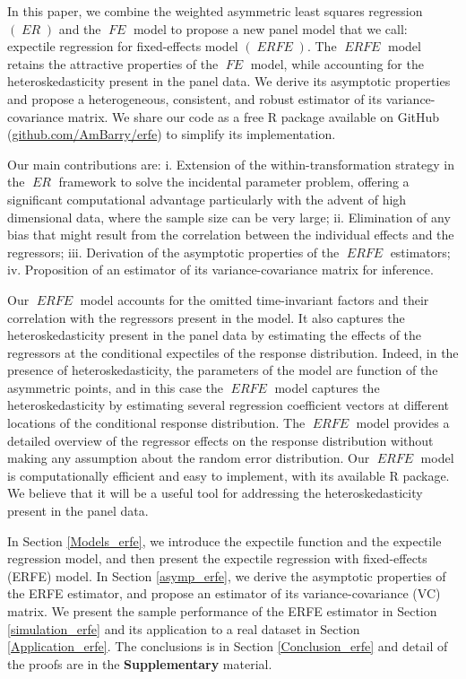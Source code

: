 \documentclass[15pt,a4paper]{article}
\DeclareMathOperator{\ERFE}{\textit{ERFE}}
\DeclareMathOperator{\ER}{\textit{ER}}
\DeclareMathOperator{\FE}{\textit{FE}}
\begin{document}
In this paper, we combine the weighted asymmetric least squares regression $(\ER)$ and the $\FE$ model to propose a new panel model that we call: expectile regression for fixed-effects model $(\ERFE).$ The $\ERFE$ model retains the attractive properties of the $\FE$ model, while accounting for the heteroskedasticity present in the panel data. We derive its asymptotic properties and propose a heterogeneous, consistent, and robust estimator of its variance-covariance matrix. We share our code as a free R package available on GitHub (\url{github.com/AmBarry/erfe}) to simplify its implementation.

Our main contributions are: i. Extension of the within-transformation strategy in the $\ER$ framework to solve the incidental parameter problem, offering a significant computational advantage particularly with the advent of high dimensional data, where the sample size can be very large;
ii. Elimination of any bias that might result from the correlation between the individual effects and the regressors;
iii. Derivation of the asymptotic properties of the $\ERFE$ estimators; iv. Proposition of an estimator of its variance-covariance matrix for inference. 

Our $\ERFE$ model accounts for the omitted time-invariant factors and their correlation with the regressors present in the model. It also captures the heteroskedasticity present in the panel data by estimating the effects of the regressors at the conditional expectiles of the response distribution. Indeed, in the presence of heteroskedasticity, the parameters of the model are function of the asymmetric points, and in this case the $\ERFE$ model captures the heteroskedasticity by estimating several regression coefficient vectors at different locations of the conditional response distribution. The $\ERFE$ model provides a detailed overview of the regressor effects on the response distribution without making any assumption about the random error distribution. Our $\ERFE$ model is computationally efficient and easy to implement, with its available R package. We believe that it will be a useful tool for addressing the heteroskedasticity present in the panel data. 


In Section \ref{Models_erfe}, we introduce the expectile function and the expectile regression model, and then present the expectile regression with fixed-effects (ERFE) model. In Section \ref{asymp_erfe}, we derive the asymptotic properties of the ERFE estimator, and propose an estimator of its variance-covariance (VC) matrix. We present the sample performance of the ERFE estimator in Section \ref{simulation_erfe} and its application to a real dataset in Section \ref{Application_erfe}. The conclusions is in Section \ref{Conclusion_erfe} and detail of the proofs are in the \textbf{Supplementary} material. 
\end{document}
